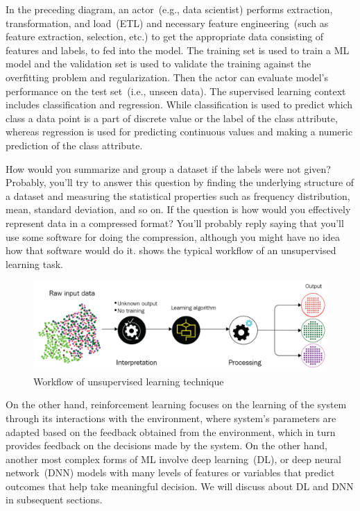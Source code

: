 \hspace*{3.5mm} In the preceding diagram, an actor~(e.g., data scientist) performs extraction, transformation, and load~(ETL) and necessary feature engineering~(such as feature extraction, selection, etc.) to get the appropriate data consisting of features and labels, to fed into the model. The training set is used to train a ML model and the validation set is used to validate the training against the overfitting problem and regularization. Then the actor can evaluate model's performance on the test set~(i.e., unseen data). The supervised learning context includes classification and regression. While classification is used to predict which class a data point is a part of discrete value or the label of the class attribute, whereas regression is used for predicting continuous values and making a numeric prediction of the class attribute.

\hspace*{3.5mm} How would you summarize and group a dataset if the labels were not given? Probably, you'll try to answer this question by finding the underlying structure of a dataset and measuring the statistical properties such as frequency distribution, mean, standard deviation, and so on. If the question is how would you effectively represent data in a compressed format? You'll probably reply saying that you'll use some software for doing the compression, although you might have no idea how that software would do it.  shows the typical workflow of an unsupervised learning task. 

\begin{figure}[h]
	\centering
	\includegraphics[scale=0.9]{images/unsup.png}
	\caption{Workflow of unsupervised learning technique~\cite{karimScalaML2019}} 
	\label{fig:ml_pipeline_unsup}
\end{figure}

\hspace*{3.5mm} On the other hand, reinforcement learning focuses on the learning of the system through its interactions with the environment, where system's parameters are adapted based on the feedback obtained from the environment, which in turn provides feedback on the decisions made by the system. On the other hand, another most complex forms of ML involve deep learning~(DL), or deep neural network~(DNN) models with many levels of features or variables that predict outcomes that help take meaningful decision. We will discuss about DL and DNN in subsequent sections. 

